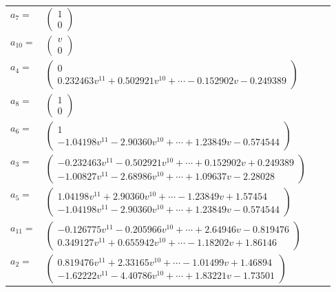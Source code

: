 \documentclass[1p]{elsarticle_modified}
\theoremstyle{definition}
\begin{document}
\begin{tabular}{m{7pt} m{180pt} m{7pt} m{180pt} }
\flushright $a_{7}=$&$\begin{pmatrix}1\\0\end{pmatrix}$ \\
\flushright $a_{10}=$&$\begin{pmatrix}v\\0\end{pmatrix}$ \\
\flushright $a_{4}=$&$\begin{pmatrix}0\\0.232463 v^{11}+0.502921 v^{10}+\cdots-0.152902 v-0.249389\end{pmatrix}$ \\
\flushright $a_{8}=$&$\begin{pmatrix}1\\0\end{pmatrix}$ \\
\flushright $a_{6}=$&$\begin{pmatrix}1\\-1.04198 v^{11}-2.90360 v^{10}+\cdots+1.23849 v-0.574544\end{pmatrix}$ \\
\flushright $a_{3}=$&$\begin{pmatrix}-0.232463 v^{11}-0.502921 v^{10}+\cdots+0.152902 v+0.249389\\-1.00827 v^{11}-2.68986 v^{10}+\cdots+1.09637 v-2.28028\end{pmatrix}$ \\
\flushright $a_{5}=$&$\begin{pmatrix}1.04198 v^{11}+2.90360 v^{10}+\cdots-1.23849 v+1.57454\\-1.04198 v^{11}-2.90360 v^{10}+\cdots+1.23849 v-0.574544\end{pmatrix}$ \\
\flushright $a_{11}=$&$\begin{pmatrix}-0.126775 v^{11}-0.205966 v^{10}+\cdots+2.64946 v-0.819476\\0.349127 v^{11}+0.655942 v^{10}+\cdots-1.18202 v+1.86146\end{pmatrix}$ \\
\flushright $a_{2}=$&$\begin{pmatrix}0.819476 v^{11}+2.33165 v^{10}+\cdots-1.01499 v+1.46894\\-1.62222 v^{11}-4.40786 v^{10}+\cdots+1.83221 v-1.73501\end{pmatrix}$ \\

\end{tabular}
\end{document}
